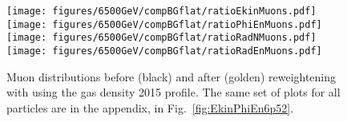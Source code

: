 \begin{figure}
\begin{center}
  \texttt{[image: figures/6500GeV/compBGflat/ratioEkinMuons.pdf]}
  \texttt{[image: figures/6500GeV/compBGflat/ratioPhiEnMuons.pdf]}
  \texttt{[image: figures/6500GeV/compBGflat/ratioRadNMuons.pdf]}
  \texttt{[image: figures/6500GeV/compBGflat/ratioRadEnMuons.pdf]}
\end{center}
\vspace{-0.6cm}
 \caption{Muon distributions before (black) and after (golden) reweightening with using the gas density 2015 profile. The same set of plots for all particles are in the appendix, in Fig.~\ref{fig:EkinPhiEn6p52}.
  \label{fig:EkinPhiEn6p5}}
\end{figure}
